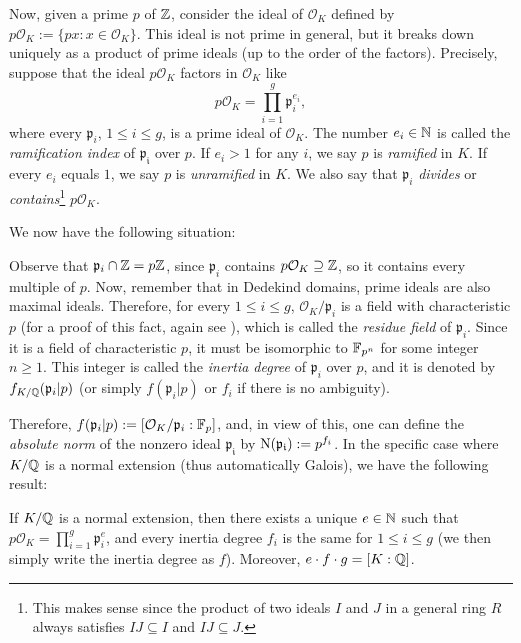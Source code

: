 \documentclass[../main.tex]{subfiles}
\begin{document}
Now, given a prime $p$ of $\mathbb{Z}$, consider the ideal of $\mathcal{O}_K$ defined by $p\mathcal{O}_K:=\{px: x\in \mathcal{O}_K\}$. This ideal is not prime in general, but it breaks down uniquely as a product of prime ideals (up to the order of the factors). Precisely, suppose that the ideal $p\mathcal{O}_K$ factors in $\mathcal{O}_K$ like
	\begin{equation}\label{eq:factorfrakp}
		p\mathcal{O}_K=\prod_{i=1}^{g}\mathfrak{p}_i^{e_i},
	\end{equation}
	where every $\mathfrak{p}_i$, $1\leqslant i \leqslant g$, is a prime ideal of $\mathcal{O}_K$. The number $e_i\in\mathbb{N}$ is called the \emph{ramification index} of $\mathfrak{p_i}$ over $p$. If $e_i>1$ for any $i$, we say $p$ is \emph{ramified} in $K$. If every $e_i$ equals $1$, we say $p$ is \emph{unramified} in $K$. We also say that $\mathfrak{p}_i$ \emph{divides} or \emph{contains}\footnote{This makes sense since the product of two ideals $I$ and $J$ in a general ring $R$ always satisfies $IJ\subseteq I$ and $IJ\subseteq J$.} $p\mathcal{O}_K$.

We now have the following situation:
\begin{center}
\end{center}
Observe that $\mathfrak{p}_i\cap\mathbb{Z}=p\mathbb{Z}$, since $\mathfrak{p}_i$ contains $p\mathcal{O}_K\supseteq \mathbb{Z}$, so it contains every multiple of $p$. Now, remember that in Dedekind domains, prime ideals are also maximal ideals. Therefore, for every $1\leqslant i \leqslant g$, $\mathcal{O}_K/\mathfrak{p}_i$ is a field with characteristic $p$ (for a proof of this fact, again see \cite[Chapter 3]{Marcus}), which is called the \emph{residue field} of $\mathfrak{p}_i$. Since it is a field of characteristic $p$, it must be isomorphic to $\mathbb{F}_{p^n}$ for some integer $n\geqslant 1$. This integer is called the \emph{inertia degree} of $\mathfrak{p}_i$ over $p$, and it is denoted by $f_{K/\mathbb{Q}}(\mathfrak{p}_i|p)$ (or simply $f(\mathfrak{p}_i|p)$ or $f_i$ if there is no ambiguity). 

Therefore, $f(\mathfrak{p}_i|p):=[\mathcal{O}_K/\mathfrak{p}_i:\mathbb{F}_p]$, and, in view of this, one can define the \emph{absolute norm} of the nonzero ideal $\mathfrak{p_i}$ by $\operatorname{N}(\mathfrak{p_i}):=p^{f_i}$. In the specific case where $K/\mathbb{Q}$ is a normal extension (thus automatically Galois), we have the following result:
\begin{proposition}\label{prop:factGalois}
	If $K/\mathbb{Q}$ is a normal extension, then there exists a unique $e\in\mathbb{N}$ such that $p\mathcal{O}_K=\prod_{i=1}^{g}\mathfrak{p}_i^{e}$, and every inertia degree $f_i$ is the same for $1\leqslant i \leqslant g$ (we then simply write the inertia degree as $f$). Moreover, $e\cdot f\cdot g=[K:\mathbb{Q}]$.
\end{proposition}
\end{document}
